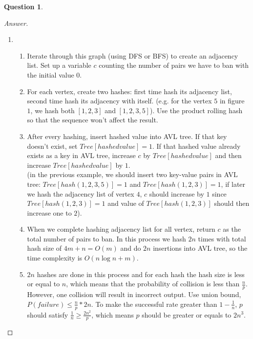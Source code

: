 \documentclass{article}
\theoremstyle{plain}
\newtheorem{question}{Question}
\newenvironment{answer}[1][Answer]
    {\begin{proof}[#1]{$ $}\renewcommand\qedsymbol{$\vartriangle$}}
    {\end{proof}}
\begin{document}
\begin{question}
\end{question}
\begin{answer}
    \begin{enumerate}
        \item
        \begin{enumerate}
            \item Iterate through this graph (using DFS or BFS) to create an adjacency list. Set up a variable $c$ counting the number of pairs we have to ban with the initial value $0$.
            \item For each vertex, create two hashes: first time hash its adjacency list, second time hash its adjacency with itself. (e.g. for the vertex $5$ in figure $1$, we hash both $[1, 2, 3]$ and $[1 , 2, 3, 5]$). Use the product rolling hash so that the sequence won't affect the result.
            \item After every hashing, insert hashed value into AVL tree. If that key doesn't exist, set $Tree[hashed value] = 1$. If that hashed value already exists as a key in AVL tree, increase $c$ by $Tree[hashed value]$ and then increase $Tree[hashed value]$ by $1$.\\
            (in the previous example, we should insert two key-value pairs in AVL tree: $Tree[hash(1,2,3,5)] = 1$ and $Tree[hash(1,2,3)] = 1$, if later we hash the adjacency list of vertex $4$, $c$ should increase by $1$ since $Tree[hash(1,2,3)] = 1$ and value of $Tree[hash(1,2,3)]$ should then increase one to $2$).
            \item When we complete hashing adjacency list for all vertex, return $c$ as the total number of pairs to ban. In this process we hash $2n$ times with total hash size of $4m + n = O(m)$ and do $2n$ insertions into AVL tree, so the time complexity is $O(n \log n + m)$.
            \item $2n$ hashes are done in this process and for each hash the hash size is less or equal to $n$, which means that the probability of collision is less than $\displaystyle \frac{n}{p}$. However, one collision will result in incorrect output. Use union bound, $P(failure) \leq \displaystyle \frac{n}{p} * 2n$. To make the successful rate greater than $\displaystyle 1 - \frac{1}{n}$, $p$ should satisfy $\displaystyle\frac{1}{n} \geq \frac{2n^2}{p}$, which means $p$ should be greater or equals to $2n^3$.
        \end{enumerate}
    \end{enumerate}
\end{answer}
\end{document}
